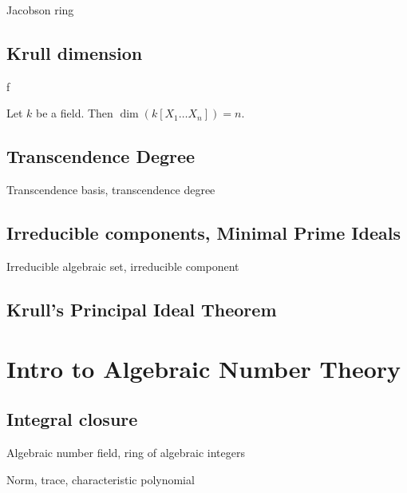 \begin{definition}
    Jacobson ring
\end{definition}

\subsection{Krull dimension}

\begin{theorem}
    f
\end{theorem}

\begin{theorem}
    Let $k$ be a field. Then $\dim(k[X_1\ldots X_n])=n$.
\end{theorem}

\subsection{Transcendence Degree}

\begin{definition}
    Transcendence basis, transcendence degree
\end{definition}

\subsection{Irreducible components, Minimal Prime Ideals}

\begin{definition}
    Irreducible algebraic set, irreducible component
\end{definition}

\subsection{Krull's Principal Ideal Theorem}

\section{Intro to Algebraic Number Theory}

\subsection{Integral closure}

\begin{definition}
    Algebraic number field, ring of algebraic integers

    Norm, trace, characteristic polynomial
\end{definition}

